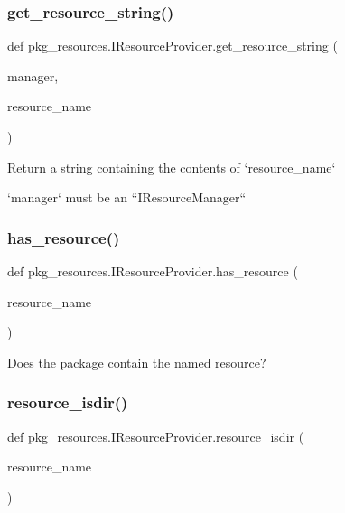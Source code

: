 \subsubsection{\texorpdfstring{get\+\_\+resource\+\_\+string()}{get\_resource\_string()}}
{\footnotesize\ttfamily def pkg\+\_\+resources.\+I\+Resource\+Provider.\+get\+\_\+resource\+\_\+string (\begin{DoxyParamCaption}\item[{}]{manager,  }\item[{}]{resource\+\_\+name }\end{DoxyParamCaption})}

\begin{DoxyVerb}Return a string containing the contents of `resource_name`

`manager` must be an ``IResourceManager``\end{DoxyVerb}
 \mbox{\label{classpkg__resources_1_1IResourceProvider_a3be0ded1d6af19617ec116f70ea16320}} 
\subsubsection{\texorpdfstring{has\+\_\+resource()}{has\_resource()}}
{\footnotesize\ttfamily def pkg\+\_\+resources.\+I\+Resource\+Provider.\+has\+\_\+resource (\begin{DoxyParamCaption}\item[{}]{resource\+\_\+name }\end{DoxyParamCaption})}

\begin{DoxyVerb}Does the package contain the named resource?\end{DoxyVerb}
 \mbox{\label{classpkg__resources_1_1IResourceProvider_a02156b99af212145832c8b41b9448499}} 
\subsubsection{\texorpdfstring{resource\+\_\+isdir()}{resource\_isdir()}}
{\footnotesize\ttfamily def pkg\+\_\+resources.\+I\+Resource\+Provider.\+resource\+\_\+isdir (\begin{DoxyParamCaption}\item[{}]{resource\+\_\+name }\end{DoxyParamCaption})}

